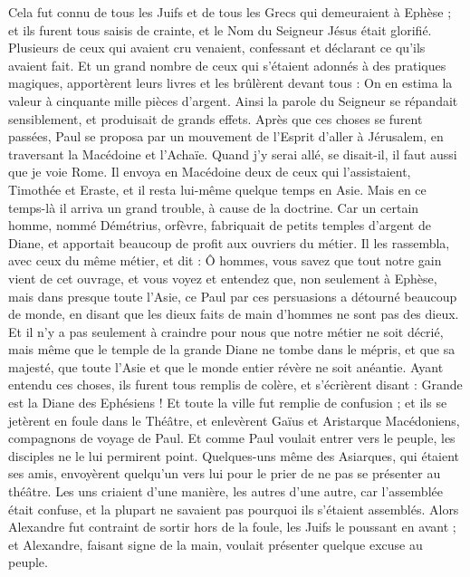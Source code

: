 \begin{multicols}{2}
Cela fut connu de tous les Juifs et de tous les Grecs qui demeuraient à Ephèse ; et ils furent tous saisis de crainte, et le Nom du Seigneur Jésus était glorifié.
Plusieurs de ceux qui avaient cru venaient, confessant et déclarant ce qu'ils avaient fait.
Et un grand nombre de ceux qui s'étaient adonnés à des pratiques magiques, apportèrent leurs livres et les brûlèrent devant tous : On en estima la valeur à cinquante mille pièces d'argent.
Ainsi la parole du Seigneur se répandait sensiblement, et produisait de grands effets.
Après que ces choses se furent passées, Paul se proposa par un mouvement de l'Esprit d'aller à Jérusalem, en traversant la Macédoine et l'Achaïe. Quand j'y serai allé, se disait-il, il faut aussi que je voie Rome.
Il envoya en Macédoine deux de ceux qui l'assistaient, Timothée et Eraste, et il resta lui-même quelque temps en Asie.
Mais en ce temps-là il arriva un grand trouble, à cause de la doctrine.
Car un certain homme, nommé Démétrius, orfèvre, fabriquait de petits temples d'argent de Diane, et apportait beaucoup de profit aux ouvriers du métier.
Il les rassembla, avec ceux du même métier, et dit : Ô hommes, vous savez que tout notre gain vient de cet ouvrage,
et vous voyez et entendez que, non seulement à Ephèse, mais dans presque toute l'Asie, ce Paul par ces persuasions a détourné beaucoup de monde, en disant que les dieux faits de main d'hommes ne sont pas des dieux.
Et il n'y a pas seulement à craindre pour nous que notre métier ne soit décrié, mais même que le temple de la grande Diane ne tombe dans le mépris, et que sa majesté, que toute l'Asie et que le monde entier révère ne soit anéantie.
Ayant entendu ces choses, ils furent tous remplis de colère, et s'écrièrent disant : Grande est la Diane des Ephésiens !
Et toute la ville fut remplie de confusion ; et ils se jetèrent en foule dans le Théâtre, et enlevèrent Gaïus et Aristarque Macédoniens, compagnons de voyage de Paul.
Et comme Paul voulait entrer vers le peuple, les disciples ne le lui permirent point.
Quelques-uns même des Asiarques, qui étaient ses amis, envoyèrent quelqu'un vers lui pour le prier de ne pas se présenter au théâtre.
Les uns criaient d'une manière, les autres d'une autre, car l'assemblée était confuse, et la plupart ne savaient pas pourquoi ils s'étaient assemblés.
Alors Alexandre fut contraint de sortir hors de la foule, les Juifs le poussant en avant ; et Alexandre, faisant signe de la main, voulait présenter quelque excuse au peuple.

\end{multicols}
